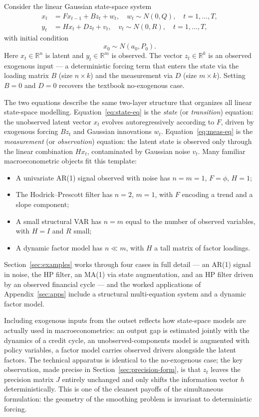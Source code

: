 \documentclass[11pt]{article}
\begin{document}
Consider the linear Gaussian state-space system
\begin{align}
x_t &= F x_{t-1}+ B z_t + w_t,\quad w_t\sim N(0,Q),\quad t=1,\ldots,T,
\label{eq:state-eq}\\
y_t &= Hx_t+ D z_t + v_t,\quad v_t\sim N(0,R),\quad t=1,\ldots,T,
\label{eq:meas-eq}
\end{align}
with initial condition
\begin{equation}
x_0\sim N(a_0,P_0).
\end{equation}
Here $x_t\in\mathbb R^n$ is latent and $y_t\in\mathbb R^m$ is observed.
The vector $z_t\in\mathbb R^k$ is an observed exogenous input --- a
deterministic forcing term that enters the state via the loading
matrix $B$ (size $n\times k$) and the measurement via $D$ (size
$m\times k$).  Setting $B=0$ and $D=0$ recovers the textbook
no-exogenous case.

The two equations describe the same two-layer structure that organizes
all linear state-space modelling.  Equation~\eqref{eq:state-eq} is the
\emph{state} (or \emph{transition}) equation: the unobserved latent
vector $x_t$ evolves autoregressively according to $F$, driven by
exogenous forcing $Bz_t$ and Gaussian innovations $w_t$.
Equation~\eqref{eq:meas-eq} is the \emph{measurement} (or
\emph{observation}) equation: the latent state is observed only through
the linear combination $Hx_t$, contaminated by Gaussian noise $v_t$.
Many familiar macroeconometric objects fit this template:
\begin{itemize}[leftmargin=2em,topsep=2pt,itemsep=1pt]
\item A univariate AR(1) signal observed with noise has $n=m=1$,
  $F=\phi$, $H=1$;
\item The Hodrick--Prescott filter has $n=2$, $m=1$, with $F$
  encoding a trend and a slope component;
\item A small structural VAR has $n=m$ equal to the number of
  observed variables, with $H=I$ and $R$ small;
\item A dynamic factor model has $n\ll m$, with $H$ a tall matrix of
  factor loadings.
\end{itemize}
Section~\ref{sec:examples} works through four cases in full detail ---
an AR(1) signal in noise, the HP filter, an MA(1) via state
augmentation, and an HP filter driven by an observed financial cycle
--- and the worked applications of Appendix~\ref{sec:apps} include a
structural multi-equation system and a dynamic factor model.

Including exogenous inputs from the outset reflects how state-space
models are actually used in macroeconometrics: an output gap is
estimated jointly with the dynamics of a credit cycle, an
unobserved-components model is augmented with policy variables, a
factor model carries observed drivers alongside the latent factors.
The technical apparatus is identical to the no-exogenous case; the
key observation, made precise in Section~\ref{sec:precision-form}, is that
$z_t$ leaves the precision matrix $J$ entirely unchanged and only
shifts the information vector $h$ deterministically.  This is one of
the cleanest payoffs of the simultaneous formulation: the geometry of
the smoothing problem is invariant to deterministic forcing.
\end{document}
